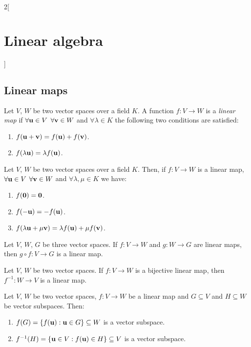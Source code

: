 \documentclass[../../../main.tex]{subfiles}
\begin{document}
\begin{multicols}{2}[\section{Linear algebra}]
  \subsection{Linear maps}
  \begin{definition}
    Let $V$, $W$ be two vector spaces over a field $K$. A function $f:V\rightarrow W$ is a \textit{linear map} if $\forall\vb{u}\in V$ $\forall\vb{v}\in W$ and $\forall\lambda\in K$ the following two conditions are satisfied:
    \begin{enumerate}
      \item $f(\vb{u}+\vb{v})=f(\vb{u})+f(\vb{v})$.
      \item $f(\lambda \vb{u})=\lambda f(\vb{u})$.
    \end{enumerate}
  \end{definition}
  \begin{prop}
    Let $V$, $W$ be two vector spaces over a field $K$. Then, if $f:V\rightarrow W$ is a linear map, $\forall\vb{u}\in V$ $\forall\vb{v}\in W$ and $\forall\lambda,\mu\in K$ we have:
    \begin{enumerate}
      \item $f(\vb{0})=\vb{0}$.
      \item $f(-\vb{u})=-f(\vb{u})$.
      \item $f(\lambda\vb{u}+\mu\vb{v})=\lambda f(\vb{u})+\mu f(\vb{v})$.
    \end{enumerate}
  \end{prop}
  \begin{prop}
    Let $V$, $W$, $G$ be three vector spaces. If $f:V\rightarrow W$ and $g:W\rightarrow G$ are linear maps, then $g\circ f:V\rightarrow G$ is a linear map.
  \end{prop}
  \begin{prop}
    Let $V$, $W$ be two vector spaces. If $f:V\rightarrow W$ is a bijective linear map, then $f^{-1}:W\rightarrow V$ is a linear map.
  \end{prop}
  \begin{prop}
    Let $V$, $W$ be two vector spaces, $f:V\rightarrow W$ be a linear map and $G\subseteq V$ and $H\subseteq W$ be vector subspaces. Then:
    \begin{enumerate}
      \item $f(G)=\{f(\vb{u}): \vb{u}\in G\}\subseteq W$ is a vector subspace.
      \item $f^{-1}(H)=\{\vb{u}\in V: f(\vb{u})\in H\}\subseteq V$ is a vector subspace.

\end{enumerate}
\end{prop}
\end{multicols}
\end{document}
